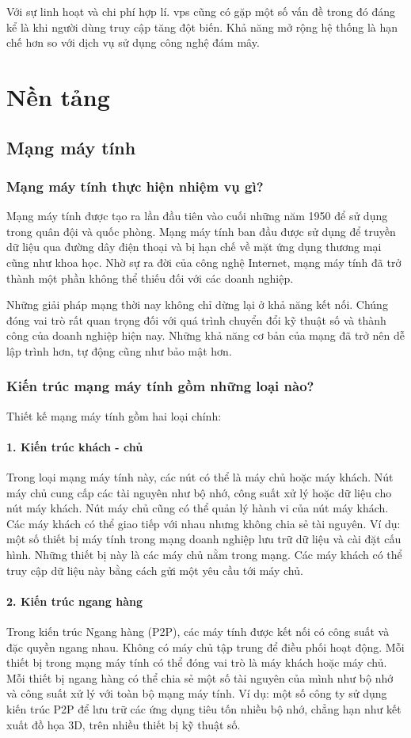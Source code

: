 Với sự linh hoạt và chi phí hợp lí. \acrshort{vps} cũng có gặp một số vấn đề trong đó đáng kể là khi người dùng truy cập tăng đột biến. Khả năng mở rộng hệ thống là hạn chế hơn so với dịch vụ sử dụng công nghệ đám mây. 

\section{Nền tảng}
\subsection{Mạng máy tính}
\subsubsection{Mạng máy tính thực hiện nhiệm vụ gì?}
Mạng máy tính được tạo ra lần đầu tiên vào cuối những năm 1950 để sử dụng trong quân đội và quốc phòng. Mạng máy tính ban đầu được sử dụng để truyền dữ liệu qua đường dây điện thoại và bị hạn chế về mặt ứng dụng thương mại cũng như khoa học. Nhờ sự ra đời của công nghệ Internet, mạng máy tính đã trở thành một phần không thể thiếu đối với các doanh nghiệp.

Những giải pháp mạng thời nay không chỉ dừng lại ở khả năng kết nối. Chúng đóng vai trò rất quan trọng đối với quá trình chuyển đổi kỹ thuật số và thành công của doanh nghiệp hiện nay. Những khả năng cơ bản của mạng đã trở nên dễ lập trình hơn, tự động cũng như bảo mật hơn.

\subsubsection{Kiến trúc mạng máy tính gồm những loại nào?}
Thiết kế mạng máy tính gồm hai loại chính:
\paragraph*{1. Kiến trúc khách - chủ}
Trong loại mạng máy tính này, các nút có thể là máy chủ hoặc máy khách. Nút máy chủ cung cấp các tài nguyên như bộ nhớ, công suất xử lý hoặc dữ liệu cho nút máy khách. Nút máy chủ cũng có thể quản lý hành vi của nút máy khách. Các máy khách có thể giao tiếp với nhau nhưng không chia sẻ tài nguyên. Ví dụ: một số thiết bị máy tính trong mạng doanh nghiệp lưu trữ dữ liệu và cài đặt cấu hình. Những thiết bị này là các máy chủ nằm trong mạng. Các máy khách có thể truy cập dữ liệu này bằng cách gửi một yêu cầu tới máy chủ.

\paragraph*{2. Kiến trúc ngang hàng}
Trong kiến trúc Ngang hàng (P2P), các máy tính được kết nối có công suất và đặc quyền ngang nhau. Không có máy chủ tập trung để điều phối hoạt động. Mỗi thiết bị trong mạng máy tính có thể đóng vai trò là máy khách hoặc máy chủ. Mỗi thiết bị ngang hàng có thể chia sẻ một số tài nguyên của mình như bộ nhớ và công suất xử lý với toàn bộ mạng máy tính. Ví dụ: một số công ty sử dụng kiến trúc P2P để lưu trữ các ứng dụng tiêu tốn nhiều bộ nhớ, chẳng hạn như kết xuất đồ họa 3D, trên nhiều thiết bị kỹ thuật số.

